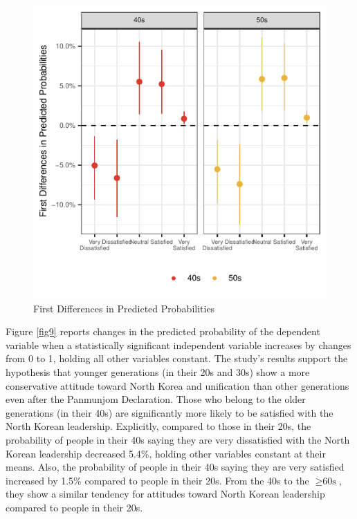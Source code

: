 \documentclass[letterpaper,9pt,twocolumn,twoside,]{pinp}
\begin{document}
\begin{figure}[ht]

{\centering \includegraphics{manuscript_files/figure-latex/fig9-1} 

}

\caption{\label{fig9} First Differences in Predicted Probabilities}\label{fig:fig9}
\end{figure}

Figure \ref{fig9} reports changes in the predicted probability of the
dependent variable when a statistically significant independent variable
increases by changes from 0 to 1, holding all other variables constant.
The study's results support the hypothesis that younger generations (in
their 20s and 30s) show a more conservative attitude toward North Korea
and unification than other generations even after the Panmunjom
Declaration. Those who belong to the older generations (in their 40s)
are significantly more likely to be satisfied with the North Korean
leadership. Explicitly, compared to those in their 20s, the probability
of people in their 40s saying they are very dissatisfied with the North
Korean leadership decreased 5.4\%, holding other variables constant at
their means. Also, the probability of people in their 40s saying they
are very satisfied increased by 1.5\% compared to people in their 20s.
From the 40s to the \(\geq\text{60s}\), they show a similar tendency for
attitudes toward North Korean leadership compared to people in their
20s.
\end{document}
